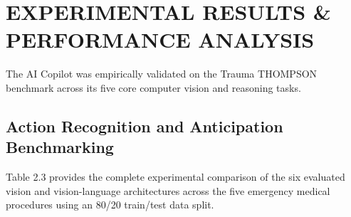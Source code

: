 \documentclass[12pt,a4paper]{report}
\begin{document}
\section{EXPERIMENTAL RESULTS \& PERFORMANCE ANALYSIS}

The AI Copilot was empirically validated on the Trauma THOMPSON benchmark across its five core computer vision and reasoning tasks.

\subsection{Action Recognition and Anticipation Benchmarking}
Table 2.3 provides the complete experimental comparison of the six evaluated vision and vision-language architectures across the five emergency medical procedures using an 80/20 train/test data split.
\end{document}
